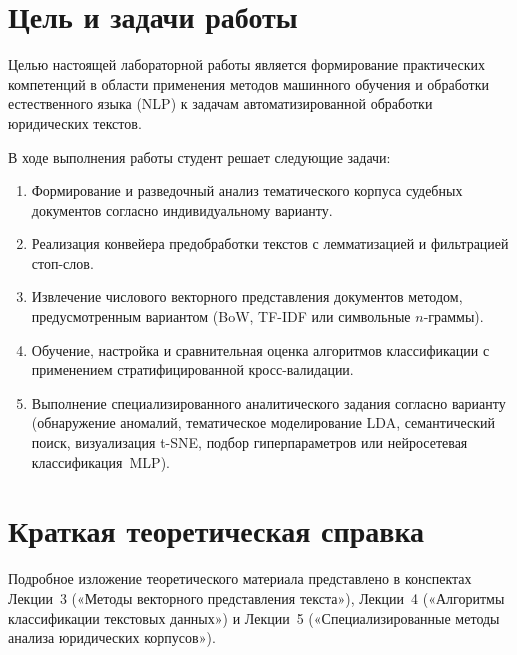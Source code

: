 \documentclass[12pt, a4paper]{report}
\begin{document}
\tableofcontents
\thispagestyle{plain}
\clearpage

\chapter{Цель и задачи работы}

Целью настоящей лабораторной работы является формирование практических компетенций
в области применения методов машинного обучения и обработки естественного языка (NLP)
к задачам автоматизированной обработки юридических текстов.

В ходе выполнения работы студент решает следующие задачи:

\begin{enumerate}
  \item Формирование и разведочный анализ тематического корпуса судебных документов
        согласно индивидуальному варианту.
  \item Реализация конвейера предобработки текстов с лемматизацией и фильтрацией стоп-слов.
  \item Извлечение числового векторного представления документов методом, предусмотренным вариантом
        (BoW, TF-IDF или символьные $n$-граммы).
  \item Обучение, настройка и сравнительная оценка алгоритмов классификации с применением
        стратифицированной кросс-валидации.
  \item Выполнение специализированного аналитического задания согласно варианту
        (обнаружение аномалий, тематическое моделирование LDA, семантический поиск,
        визуализация t-SNE, подбор гиперпараметров или нейросетевая классификация~MLP).
\end{enumerate}

\chapter{Краткая теоретическая справка}

\begin{tcolorbox}[colback=LightBlue!50, colframe=NavyBlue,
  fonttitle=\sffamily\small\bfseries\color{NavyBlue}, boxrule=1pt,
  left=8pt, right=8pt, top=6pt, bottom=6pt, title={Источники}]
  Подробное изложение теоретического материала представлено в конспектах Лекции~3
  («Методы векторного представления текста»), Лекции~4
  («Алгоритмы классификации текстовых данных») и Лекции~5
  («Специализированные методы анализа юридических корпусов»).
\end{tcolorbox}
\end{document}
